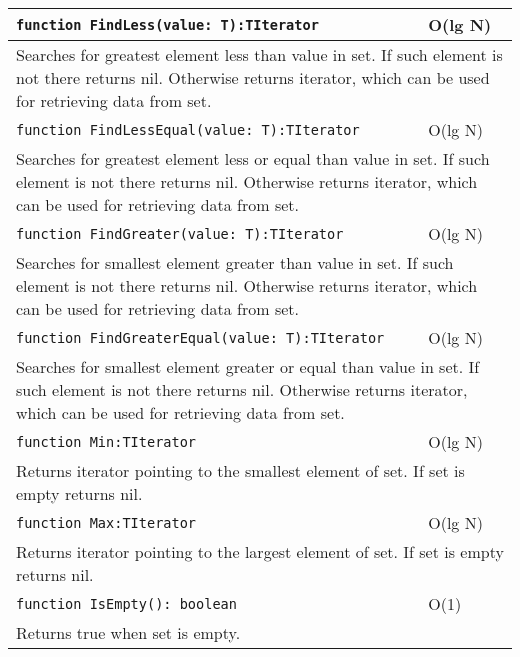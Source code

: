 \begin{longtable}{|m{10cm}|m{5cm}|}
\verb!function FindLess(value: T):TIterator! & O(lg N) \\\hline
\multicolumn{2}{|m{15cm}|}{Searches for greatest element less than value in set. If such element is not there returns nil. Otherwise
returns iterator, which can be used for retrieving data from set.} \\\hline\hline

\verb!function FindLessEqual(value: T):TIterator! & O(lg N) \\\hline
\multicolumn{2}{|m{15cm}|}{Searches for greatest element less or equal than value in set. If such element is not there returns nil. Otherwise
returns iterator, which can be used for retrieving data from set.} \\\hline\hline

\verb!function FindGreater(value: T):TIterator! & O(lg N) \\\hline
\multicolumn{2}{|m{15cm}|}{Searches for smallest element greater than value in set. If such element is not there returns nil. Otherwise
returns iterator, which can be used for retrieving data from set.} \\\hline\hline

\verb!function FindGreaterEqual(value: T):TIterator! & O(lg N) \\\hline
\multicolumn{2}{|m{15cm}|}{Searches for smallest element greater or equal than value in set. If such element is not there returns nil. Otherwise
returns iterator, which can be used for retrieving data from set.} \\\hline\hline

\verb!function Min:TIterator! & O(lg N) \\\hline
\multicolumn{2}{|m{15cm}|}{Returns iterator pointing to the smallest element of set. If set is empty returns
nil.} \\\hline\hline

\verb!function Max:TIterator! & O(lg N) \\\hline
\multicolumn{2}{|m{15cm}|}{Returns iterator pointing to the largest element of set. If set is empty returns
nil.} \\\hline\hline

\verb!function IsEmpty(): boolean! & O(1) \\ \hline
\multicolumn{2}{|m{15cm}|}{Returns true when set is empty.} \\\hline

\end{longtable}


